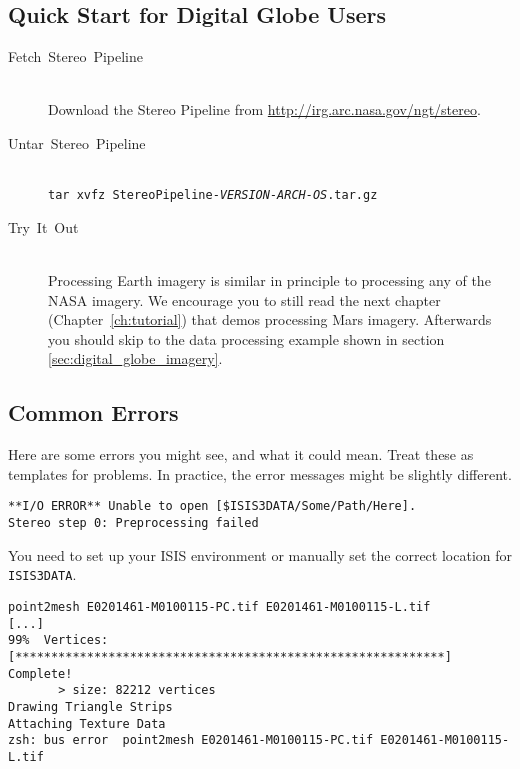 \subsection{Quick Start for Digital Globe Users}
\label{quickstartDG}
\begin{description}

\item[{Fetch~Stereo~Pipeline}] ~\\
Download the Stereo Pipeline from \url{http://irg.arc.nasa.gov/ngt/stereo}.

\item[{Untar~Stereo~Pipeline}] ~\\
\texttt{tar xvfz StereoPipeline-\textit{VERSION-ARCH-OS}.tar.gz}

\item [{Try~It~Out}] ~\\
Processing Earth imagery is similar in principle to processing any of
the NASA imagery. We encourage you to still read the next chapter
(Chapter~\ref{ch:tutorial}) that demos processing Mars
imagery. Afterwards you should skip to the data processing example
shown in section \ref{sec:digital_globe_imagery}.

\end{description}

\subsection{Common Errors}

Here are some errors you might see, and what it could mean. Treat
these as templates for problems.  In practice, the error messages might
be slightly different.

\begin{verbatim}
**I/O ERROR** Unable to open [$ISIS3DATA/Some/Path/Here].
Stereo step 0: Preprocessing failed
\end{verbatim}

You need to set up your ISIS environment or manually set the correct
location for \texttt{ISIS3DATA}.

\begin{verbatim}
point2mesh E0201461-M0100115-PC.tif E0201461-M0100115-L.tif
[...]
99%  Vertices:   [************************************************************] Complete!
       > size: 82212 vertices
Drawing Triangle Strips
Attaching Texture Data
zsh: bus error  point2mesh E0201461-M0100115-PC.tif E0201461-M0100115-L.tif
\end{verbatim}

